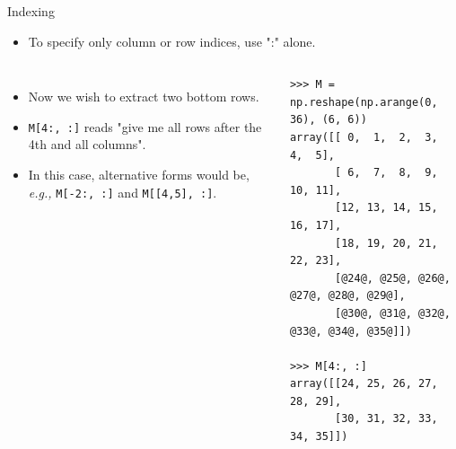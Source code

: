 \documentclass[10pt, aspectratio=169]{beamer} %
\begin{document}
\begin{frame}[fragile,allowframebreaks=0.8]
 {Indexing}
\begin{itemize}
\item To specify only column or row indices, use ":" alone.
\end{itemize}
\vspace*{-0.3cm}
\begin{columns}[T]
\hspace*{0.05cm}
\begin{itemize}
\item Now we wish to extract two bottom rows.
\item \verb+M[4:, :]+ reads "give me all rows after the 4th and all columns".
\item In this case, alternative forms would be, \emph{e.g.,} \verb+M[-2:, :]+ and \verb+M[[4,5], :]+.
\end{itemize}
\begin{lstlisting}
>>> M = np.reshape(np.arange(0, 36), (6, 6))
array([[ 0,  1,  2,  3,  4,  5],
       [ 6,  7,  8,  9, 10, 11],
       [12, 13, 14, 15, 16, 17],
       [18, 19, 20, 21, 22, 23],
       [@24@, @25@, @26@, @27@, @28@, @29@],
       [@30@, @31@, @32@, @33@, @34@, @35@]])

>>> M[4:, :]
array([[24, 25, 26, 27, 28, 29],
       [30, 31, 32, 33, 34, 35]])
\end{lstlisting}
\end{columns}
\end{frame}
\end{document}
